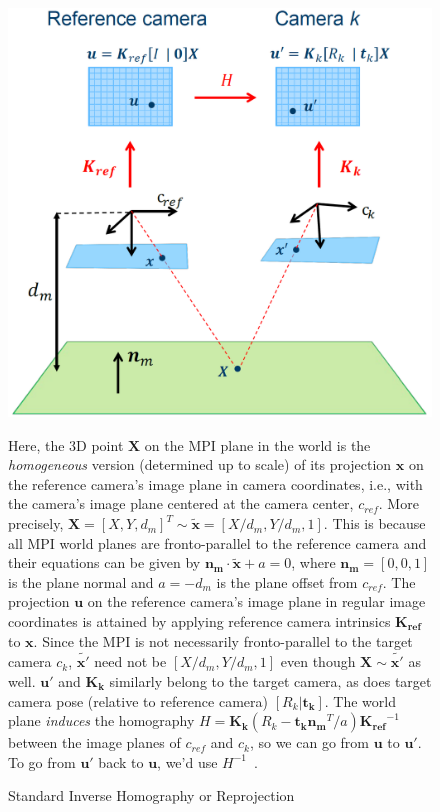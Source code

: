 \begin{figure}[!h]
    \includegraphics[width=0.75\columnwidth]{figures/standard-inverse-homography.png}
    \caption{Standard Inverse Homography or Reprojection~\cite{brann_forelesninger_2016}}
    \label{fig:standard-inverse-homography}
    {\small Here, the 3D point $\boldsymbol{X}$ on the MPI plane in the world is the \textit{homogeneous} version (determined up to scale) of its projection $\boldsymbol{x}$ on the reference camera's image plane in camera coordinates, i.e., with the camera's image plane centered at the camera center, $c_{ref}$. More precisely, $\boldsymbol{X} = [X,Y,d_m]^T \sim \tilde{\boldsymbol{x}} = [X/d_m,Y/d_m,1]$. This is because all MPI world planes are fronto-parallel to the reference camera and their equations can be given by $\boldsymbol{n_m \cdot \tilde{x}} + a = 0$, where $\boldsymbol{n_m} = [0,0,1]$ is the plane normal and $a = -d_m$ is the plane offset from $c_{ref}$. The projection $\boldsymbol{u}$ on the reference camera's image plane in regular image coordinates is attained by applying reference camera intrinsics $\boldsymbol{K_{ref}}$ to $\boldsymbol{x}$. Since the MPI is not necessarily fronto-parallel to the target camera $c_k$, $\tilde{\boldsymbol{x'}}$ need not be $[X/d_m,Y/d_m,1]$ even though $\boldsymbol{X} \sim \tilde{\boldsymbol{x'}}$ as well. $\boldsymbol{u'}$ and $\boldsymbol{K_k}$ similarly belong to the target camera, as does target camera pose (relative to reference camera) $[R_k|\boldsymbol{t_k}]$. The world plane \textit{induces} the homography $H = \boldsymbol{K_k} (R_k - \boldsymbol{t_k} \boldsymbol{n_m}^T / a) \boldsymbol{K_{ref}}^{-1}$ between the image planes of $c_{ref}$ and $c_k$, so we can go from $\boldsymbol{u}$ to $\boldsymbol{u'}$. To go from $\boldsymbol{u'}$ back to $\boldsymbol{u}$, we'd use $H^{-1}$~\cite{zikuicai_derivation_2019}.}
\end{figure}

